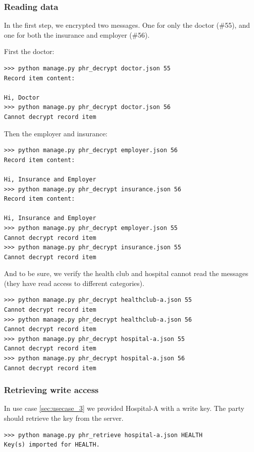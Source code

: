 \documentclass[a4paper]{article}
\begin{document}
		\subsubsection{Reading data}\label{sec:usecase_5}
			In the first step, we encrypted two messages. One for only the doctor (\#55), and one for both the insurance and employer (\#56). 
			
			First the doctor:
			
			\begin{lstlisting}
>>> python manage.py phr_decrypt doctor.json 55
Record item content:

Hi, Doctor
>>> python manage.py phr_decrypt doctor.json 56
Cannot decrypt record item
			\end{lstlisting}

			Then the employer and insurance:

			\begin{lstlisting}
>>> python manage.py phr_decrypt employer.json 56
Record item content:

Hi, Insurance and Employer
>>> python manage.py phr_decrypt insurance.json 56
Record item content:

Hi, Insurance and Employer
>>> python manage.py phr_decrypt employer.json 55
Cannot decrypt record item
>>> python manage.py phr_decrypt insurance.json 55
Cannot decrypt record item
			\end{lstlisting}
			
			And to be sure, we verify the health club and hospital cannot read the messages (they have read access to different categories).

			\begin{lstlisting}
>>> python manage.py phr_decrypt healthclub-a.json 55
Cannot decrypt record item
>>> python manage.py phr_decrypt healthclub-a.json 56
Cannot decrypt record item
>>> python manage.py phr_decrypt hospital-a.json 55
Cannot decrypt record item
>>> python manage.py phr_decrypt hospital-a.json 56
Cannot decrypt record item
			\end{lstlisting}
		
		\subsubsection{Retrieving write access}\label{sec:usecase_6}
			In use case \ref{sec:usecase_3} we provided Hospital-A with a write key. The party should retrieve the key from the server.
			
			\begin{lstlisting}
>>> python manage.py phr_retrieve hospital-a.json HEALTH
Key(s) imported for HEALTH.
			\end{lstlisting}
			
\end{document}
